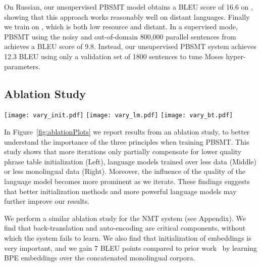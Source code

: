 \documentclass[11pt,a4paper]{article}
\begin{document}
On Russian, our unsupervised PBSMT model obtains a BLEU score of 16.6 on , showing that this approach works reasonably well on distant languages. 
Finally we train on , which is both low resource and distant. In a supervised mode, PBSMT using the noisy and out-of-domain 800,000 parallel sentences from~\citet{tiedemann2012parallel} achieves a BLEU score of 9.8. Instead, our unsupervised PBSMT system achieves 12.3 BLEU using only a validation set of 1800 sentences to tune Moses hyper-parameters.


\subsection{Ablation Study} \label{sec:ablation}
\begin{figure*}[!t]
  \texttt{[image: vary\_init.pdf]}
\endminipage\hfill
{}
  \texttt{[image: vary\_lm.pdf]}
\endminipage\hfill
{}
  \texttt{[image: vary\_bt.pdf]}
\endminipage
\caption{\small{Results with PBSMT on the  pair at different iterations. We vary: Left) the quality of the initial alignment between the source and target embeddings (measured in P@1 on the word translation task), Middle) the number of sentences used to train the language models, Right) the number of sentences used for back-translation.}}
\label{fig:ablationPlots}
\vspace{-0.25cm}
\end{figure*}

In Figure~\ref{fig:ablationPlots} we report results from an ablation study, to better understand the importance of the three principles when training PBSMT. This study shows that more iterations only partially compensate for lower quality phrase table initialization (Left), language models trained over less data (Middle) or less monolingual data (Right). Moreover, the influence of the quality of the language model becomes more prominent as we iterate.
These findings suggests that better initialization methods and more powerful language models may further improve our results.

We perform a similar ablation study for the NMT system (see Appendix). We find that back-translation and auto-encoding are critical components, without which the system fails to learn. We also find that initialization of embeddings is very important, and we gain 7 BLEU points compared to prior work~\cite{unsupNMTartetxe,unsupNMTlample} by learning BPE embeddings over the concatenated monolingual corpora.
\end{document}

